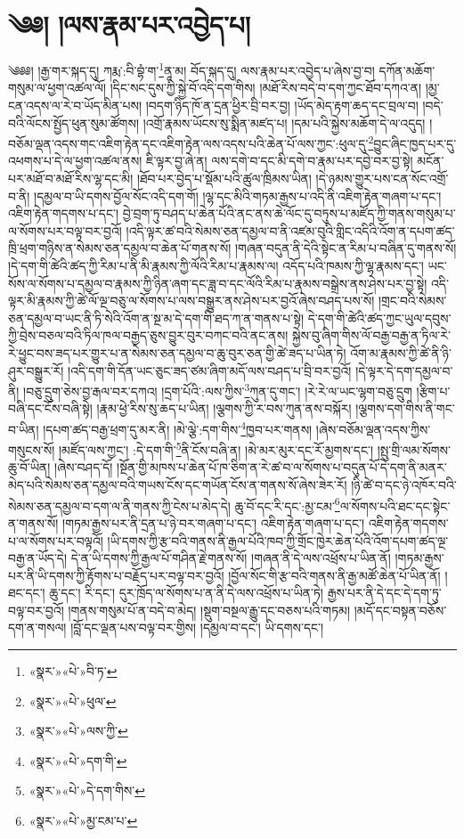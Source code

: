 \chapter{༄༅། །ལས་རྣམ་པར་འབྱེད་པ།}༄༅༅། །རྒྱ་གར་སྐད་དུ། ཀརྨ་:བི་བྷཾ་ག་\footnote{«སྣར་»«པེ་»བི་ཏ་}ནཱ་མ། བོད་སྐད་དུ། ལས་རྣམ་པར་འབྱེད་པ་ཞེས་བྱ་བ། དཀོན་མཆོག་གསུམ་ལ་ཕྱག་འཚལ་ལོ། །དིང་སང་དུས་ཀྱི་སྐྱེ་བོ་འདི་དག་གིས། །མཐོ་རིས་བདེ་བ་དག་ཀྱང་ཐོབ་དཀའ་ན། །མྱ་ངན་འདས་ལ་རེ་བ་ཡོད་མིན་པས། །བདག་ཉིད་ཁོ་ན་དྲན་ཕྱིར་བྲི་བར་བྱ། །ཡོད་མེད་རྟག་ཆད་དང་བྲལ་བ། །བདེ་བའི་ལོངས་སྤྱོད་ཕུན་སུམ་ཚོགས། །འགྲོ་རྣམས་ཡོངས་སུ་སྨིན་མཛད་པ། །དམ་པའི་སྐྱེས་མཆོག་དེ་ལ་འདུད། །བཅོམ་ལྡན་འདས་གང་འཇིག་རྟེན་དང་འཇིག་རྟེན་ལས་འདས་པའི་ཆེན་པོ་ལས་ཀྱང་:ཕུལ་དུ་\footnote{«སྣར་»«པེ་»ཕུལ་}བྱུང་ཞིང་ཁྱད་པར་དུ་འཕགས་པ་དེ་ལ་ཕྱག་འཚལ་ནས། ཇི་ལྟར་བྱ་ཞེ་ན། ལས་དགེ་བ་དང་མི་དགེ་བ་རྣམ་པར་དབྱེ་བར་བྱ་སྟེ། མངོན་པར་མཐོ་བ་མཐོ་རིས་ལྷ་དང་མི། །ཐོབ་པར་བྱེད་པ་སྡོམ་པའི་ཚུལ་ཁྲིམས་ཡིན། །དེ་ཉམས་གྱུར་པས་ངན་སོང་འགྲོ་བ་ནི། །དམྱལ་བ་ཡི་དགས་བྱོལ་སོང་འདི་དག་གོ། །ལྷ་དང་མིའི་གཏམ་རྒྱས་པ་འདི་ནི་འཇིག་རྟེན་གཞག་པ་དང་། འཇིག་རྟེན་གདགས་པ་དང་། བྱེ་བྲག་ཏུ་བཤད་པ་ཆེན་པོའི་ནང་ནས་ཆེ་ལོང་དུ་བཏུས་པ་མཛོད་ཀྱི་གནས་གསུམ་པ་ལ་སོགས་པར་བལྟ་བར་བྱའོ། །འདི་ལྟར་ཚ་བའི་སེམས་ཅན་དམྱལ་བ་ནི་འཛམ་བུའི་གླིང་འདིའི་འོག་ན་དཔག་ཚད་ཁྲི་ཕྲག་གཉིས་ན་སེམས་ཅན་དམྱལ་བ་ཆེན་པོ་གནས་སོ། །གཞན་བདུན་ནི་དེའི་སྟེང་ན་རིམ་པ་བཞིན་དུ་གནས་སོ། །དེ་དག་གི་ཚེའི་ཚད་ཀྱི་རིམ་པ་ནི་མི་རྣམས་ཀྱི་ལོའི་རིམ་པ་རྣམས་ལ། འདོད་པའི་ཁམས་ཀྱི་ལྷ་རྣམས་དང་། ཡང་སོས་ལ་སོགས་པ་དམྱལ་བ་རྣམས་ཀྱི་ཉིན་ཞག་དང་ཟླ་བ་དང་ལོའི་རིམ་པ་རྣམས་བསྒྲེས་ནས་ཤེས་པར་བྱ་སྟེ། འདི་ལྟར་མི་རྣམས་ཀྱི་ཚེ་ལོ་ལྔ་བཅུ་ལ་སོགས་པ་ལས་བསྒྱུར་ནས་ཤེས་པར་བྱའོ་ཞེས་བཤད་པས་སོ། །གྲང་བའི་སེམས་ཅན་དམྱལ་བ་ཡང་ནི་ཏི་སེའི་འོག་ན་སྔ་མ་དེ་དག་གི་ཐད་ཀ་ན་གནས་པ་སྟེ། དེ་དག་གི་ཚེའི་ཚད་ཀྱང་ཡུལ་དབུས་ཀྱི་བྲེས་བཅལ་བའི་ཏིལ་ཁལ་བརྒྱད་ཅུས་བྱུར་བུར་བཀང་བའི་ནང་ནས། སྐྱེས་བུ་ཞིག་གིས་ལོ་བརྒྱ་བརྒྱ་ན་ཏིལ་རེ་རེ་ཕྱུང་བས་ཟད་པར་གྱུར་པ་ན་སེམས་ཅན་དམྱལ་བ་ཆུ་བུར་ཅན་གྱི་ཚེ་ཟད་པ་ཡིན་ཏེ། འོག་མ་རྣམས་ཀྱི་ཚེ་ནི་ཉི་ཤུར་བསྒྱུར་རོ། །འདི་དག་གི་དོན་ཡང་ཅུང་ཟད་ཙམ་ཞིག་མདོ་ལས་བཤད་པ་བྲི་བར་བྱའོ། །དེ་ལྟར་དེ་དག་དམྱལ་བ་ནི། །བཅུ་དྲུག་ཅེས་བྱ་རྒལ་བར་དཀའ། །དྲག་པོའི་:ལས་ཀྱིས་\footnote{«སྣར་»«པེ་»ལས་ཀྱི་}ཀུན་དུ་གང་། །རེ་རེ་ལ་ཡང་ལྷག་བཅུ་དྲུག །རྩིག་པ་བཞི་དང་ངོས་བཞི་སྟེ། །རྣམ་ཕྱེ་རིས་སུ་ཆད་པ་ཡིན། །ལྕགས་ཀྱི་ར་བས་ཀུན་ནས་བསྐོར། །ལྕགས་དག་གིས་ནི་གང་བ་ཡིན། །དཔག་ཚད་བརྒྱ་ཕྲག་དུ་མར་ནི། །མེ་ལྕེ་:དག་གིས་\footnote{«སྣར་»«པེ་»དག་གི་}ཁྱབ་པར་གནས། །ཞེས་བཅོམ་ལྡན་འདས་ཀྱིས་གསུངས་སོ། །མཛོད་ལས་ཀྱང་། :དེ་དག་གི་\footnote{«སྣར་»«པེ་»དེ་དག་གིས་}ནི་ངོས་བཞི་ན། །མེ་མར་མུར་དང་རོ་མྱགས་དང་། །སྤུ་གྲི་ལམ་སོགས་ཆུ་བོ་ཡིན། །ཞེས་བཤད་དོ། །སྔོན་གྱི་མཁས་པ་ཆེན་པོ་ཁ་ཅིག་ན་རེ་ཚ་བ་ལ་སོགས་པ་བདུན་པོ་དེ་དག་ནི་མནར་མེད་པའི་སེམས་ཅན་དམྱལ་བའི་གཡས་ངོས་དང་གཡོན་ངོས་ན་གནས་སོ་ཞེས་ཟེར་རོ། །ཉི་ཚེ་བ་དང་ཉེ་འཁོར་བའི་སེམས་ཅན་དམྱལ་བ་དག་ལ་ནི་གནས་ཀྱི་ངེས་པ་མེད་དེ། ཆུ་བོ་དང་རི་དང་:མྱ་ངམ་\footnote{«སྣར་»«པེ་»མྱ་ངམ་པ་}ལ་སོགས་པའི་ཐང་དང་སྟེང་ན་གནས་སོ། །གཏམ་རྒྱས་པར་ནི་དྲན་པ་ཉེ་བར་གཞག་པ་དང་། འཇིག་རྟེན་གཞག་པ་དང་། འཇིག་རྟེན་གདགས་པ་ལ་སོགས་པར་བལྟའོ། །ཡི་དགས་ཀྱི་རྩ་བའི་གནས་ནི་རྒྱལ་པོའི་ཁབ་ཀྱི་གྲོང་ཁྱེར་ཆེན་པོའི་འོག་དཔག་ཚད་ལྔ་བརྒྱ་ན་ཡོད་དེ། དེ་ན་ཡི་དགས་ཀྱི་རྒྱལ་པོ་གཤིན་རྗེ་གནས་སོ། །གཞན་ནི་དེ་ལས་འཕྲོས་པ་ཡིན་ནོ། །གཏམ་རྒྱས་པར་ནི་ཡི་དགས་ཀྱི་རྟོགས་པ་བརྗོད་པར་བལྟ་བར་བྱའོ། །བྱོལ་སོང་གི་རྩ་བའི་གནས་ནི་རྒྱ་མཚོ་ཆེན་པོ་ཡིན་ནོ། །ཐང་དང་། ཆུ་དང་། རི་དང་། དུར་ཁྲོད་ལ་སོགས་པ་ན་ནི་དེ་ལས་འཕྲོས་པ་ཡིན་ཏེ། རྒྱས་པར་ནི་དེ་དང་དེ་དག་ཏུ་བལྟ་བར་བྱའོ། །གནས་གསུམ་པོ་ན་བདེ་བ་མེད། །སྡུག་བསྔལ་རྒྱུ་དང་བཅས་པའི་གཏམ། །མདོ་དང་བསྟན་བཅོས་དག་ན་གསལ། །བློ་དང་ལྡན་པས་བལྟ་བར་གྱིས། །དམྱལ་བ་དང་། ཡི་དགས་དང་། 